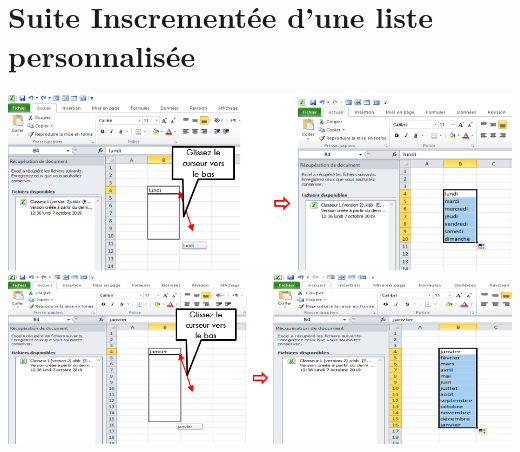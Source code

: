\section{Suite Inscrementée  d'une liste personnalisée }
\begin{center}  
	\includegraphics[scale=0.2,width= \linewidth]{img/saisi_rapide4}
	\includegraphics[scale=0.2,width= \linewidth]{img/saisi_rapide5}
\end{center}

